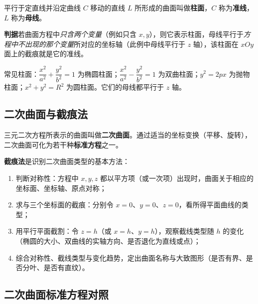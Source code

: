 \begin{definition}
平行于定直线并沿定曲线 $C$ 移动的直线 $L$ 所形成的曲面叫做\textbf{柱面}，$C$ 称为\textbf{准线}，$L$ 称为\textbf{母线}。
\end{definition}

\textbf{判据}\quad 若曲面方程中\emph{只含两个变量}（例如只含 $x,y$），则它表示柱面，母线平行于\emph{方程中不出现的那个变量}所对应的坐标轴（此例中母线平行于 $z$ 轴），该柱面在 $xOy$ 面上的截痕就是它的准线。

常见柱面：$\dfrac{x^{2}}{a^{2}}+\dfrac{y^{2}}{b^{2}}=1$ 为椭圆柱面；$\dfrac{x^{2}}{a^{2}}-\dfrac{y^{2}}{b^{2}}=1$ 为双曲柱面；$y^{2}=2px$ 为抛物柱面；$x^{2}+y^{2}=R^{2}$ 为圆柱面。它们的母线都平行于 $z$ 轴。

\subsection{二次曲面与截痕法}

\begin{definition}
三元二次方程所表示的曲面叫做\textbf{二次曲面}。通过适当的坐标变换（平移、旋转），二次曲面可化为若干种\textbf{标准方程}之一。
\end{definition}

\textbf{截痕法}是识别二次曲面类型的基本方法：

\begin{enumerate}
\item 判断对称性：方程中 $x,y,z$ 都以平方项（或一次项）出现时，曲面关于相应的坐标面、坐标轴、原点对称；
\item 求与三个坐标面的截痕：分别令 $x=0$、$y=0$、$z=0$，看所得平面曲线的类型；
\item 用平行平面截割：令 $z=h$（或 $x=h$、$y=h$），观察截线类型随 $h$ 的变化（椭圆的大小、双曲线的实轴方向、是否退化为直线或点）；
\item 综合对称性、截线类型与变化趋势，定出曲面名称与大致图形（是否有界、是否分叶、是否有直纹）。
\end{enumerate}

\subsection{二次曲面标准方程对照}

